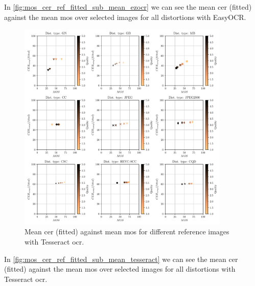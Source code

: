 In \autoref{fig:mos_cer_ref_fitted_sub_mean_ezocr} we can see the mean \gls{cer} (fitted) against the mean \gls{mos} over selected images for all distortions with EasyOCR.

\begin{figure}[h]
\centering
    \includegraphics[width=0.9\textwidth]{../../images/analyze/mos_cer_ref_fitted_sub_mean_tess.pdf}
    \caption{Mean \gls{cer} (fitted) against mean \gls{mos} for different reference images with Tesseract \gls{ocr}.}
\label{fig:mos_cer_ref_fitted_sub_mean_tesseract}
\end{figure}

In \autoref{fig:mos_cer_ref_fitted_sub_mean_tesseract} we can see the mean \gls{cer} (fitted) against the mean \gls{mos} over selected images for all distortions with Tesseract \gls{ocr}.

